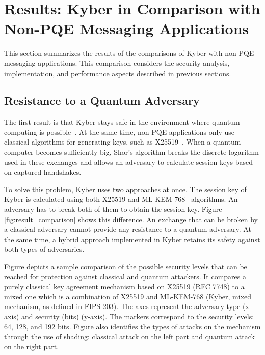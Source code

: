 \section{Results: Kyber in Comparison with Non-PQE Messaging Applications}

This section summarizes the results of the comparisons of Kyber with non-PQE messaging applications. This comparison considers the security analysis, implementation, and performance aspects described in previous sections.

\subsection{Resistance to a Quantum Adversary}

The first result is that Kyber stays safe in the environment where quantum computing is possible~\cite{shor,grover}. At the same time, non-PQE applications only use classical algorithms for generating keys, such as X25519~\cite{rfc7748}. When a quantum computer becomes sufficiently big, Shor’s algorithm breaks the discrete logarithm used in these exchanges and allows an adversary to calculate session keys based on captured handshakes.

To solve this problem, Kyber uses two approaches at once. The session key of Kyber is calculated using both X25519 and ML-KEM-768~\cite{rfc7748,fips203} algorithms. An adversary has to break both of them to obtain the session key. Figure \ref{fig:result_comparison} shows this difference. An exchange that can be broken by a classical adversary cannot provide any resistance to a quantum adversary. At the same time, a hybrid approach implemented in Kyber retains its safety against both types of adversaries.

Figure depicts a sample comparison of the possible security levels that can be reached for protection against classical and quantum attackers. It compares a purely classical key agreement mechanism based on X25519 (RFC 7748) to a mixed one which is a combination of X25519 and ML-KEM-768 (Kyber, mixed mechanism, as defined in FIPS 203). The axes represent the adversary type (x-axis) and security (bits) (y-axis). The markers correspond to the security levels: 64, 128, and 192 bits. Figure also identifies the types of attacks on the mechanism through the use of shading: classical attack on the left part and quantum attack on the right part.

